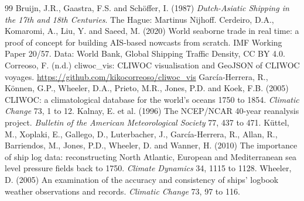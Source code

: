 \documentclass[11pt,a4paper]{article}
\begin{document}
\begin{thebibliography}{99}
 Bruijn, J.R., Gaastra, F.S. and Schöffer, I. (1987) \emph{Dutch-Asiatic Shipping in the 17th and 18th Centuries}. The Hague: Martinus Nijhoff.
 Cerdeiro, D.A., Komaromi, A., Liu, Y. and Saeed, M. (2020) World seaborne trade in real time: a proof of concept for building AIS-based nowcasts from scratch. IMF Working Paper 20/57. Data: World Bank, Global Shipping Traffic Density, CC BY 4.0.
 Correoso, F. (n.d.) cliwoc\_vis: CLIWOC visualisation and GeoJSON of CLIWOC voyages. \url{https://github.com/kikocorreoso/cliwoc_vis}
 García-Herrera, R., Können, G.P., Wheeler, D.A., Prieto, M.R., Jones, P.D. and Koek, F.B. (2005) CLIWOC: a climatological database for the world's oceans 1750 to 1854. \emph{Climatic Change} 73, 1 to 12.
 Kalnay, E. et al. (1996) The NCEP/NCAR 40-year reanalysis project. \emph{Bulletin of the American Meteorological Society} 77, 437 to 471.
 Küttel, M., Xoplaki, E., Gallego, D., Luterbacher, J., García-Herrera, R., Allan, R., Barriendos, M., Jones, P.D., Wheeler, D. and Wanner, H. (2010) The importance of ship log data: reconstructing North Atlantic, European and Mediterranean sea level pressure fields back to 1750. \emph{Climate Dynamics} 34, 1115 to 1128.
 Wheeler, D. (2005) An examination of the accuracy and consistency of ships' logbook weather observations and records. \emph{Climatic Change} 73, 97 to 116.
\end{thebibliography}
\end{document}

